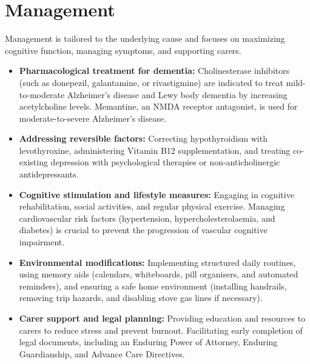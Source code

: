 \section*{Management}
Management is tailored to the underlying cause and focuses on maximizing cognitive function, managing symptoms, and supporting carers.
\begin{itemize}
    \item \textbf{Pharmacological treatment for dementia:} Cholinesterase inhibitors (such as donepezil, galantamine, or rivastigmine) are indicated to treat mild-to-moderate Alzheimer's disease and Lewy body dementia by increasing acetylcholine levels. Memantine, an NMDA receptor antagonist, is used for moderate-to-severe Alzheimer's disease.
    \item \textbf{Addressing reversible factors:} Correcting hypothyroidism with levothyroxine, administering Vitamin B12 supplementation, and treating co-existing depression with psychological therapies or non-anticholinergic antidepressants.
    \item \textbf{Cognitive stimulation and lifestyle measures:} Engaging in cognitive rehabilitation, social activities, and regular physical exercise. Managing cardiovascular risk factors (hypertension, hypercholesterolaemia, and diabetes) is crucial to prevent the progression of vascular cognitive impairment.
    \item \textbf{Environmental modifications:} Implementing structured daily routines, using memory aids (calendars, whiteboards, pill organisers, and automated reminders), and ensuring a safe home environment (installing handrails, removing trip hazards, and disabling stove gas lines if necessary).
    \item \textbf{Carer support and legal planning:} Providing education and resources to carers to reduce stress and prevent burnout. Facilitating early completion of legal documents, including an Enduring Power of Attorney, Enduring Guardianship, and Advance Care Directives.
\end{itemize}

